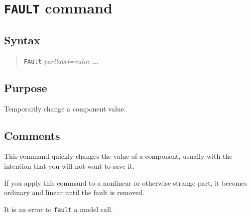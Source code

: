 %
%
%
%
\section{{\tt FAULT} command}
\subsection{Syntax}
\begin{verse}
{\tt FAult} {\it partlabel}={\it value} ...
\end{verse}
\subsection{Purpose}

Temporarily change a component value.
\subsection{Comments}

This command quickly changes the value of a component, usually with the
intention that you will not want to save it.

If you apply this command to a nonlinear or otherwise strange part, it becomes
ordinary and linear until the fault is removed.

It is an error to {\tt fault} a model call.

